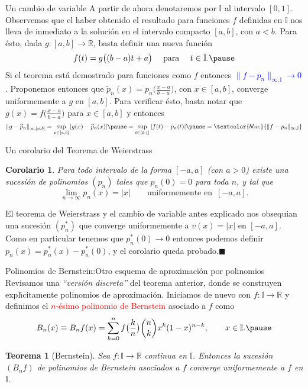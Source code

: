 \documentclass[xcolor=dvipsnames,10pt,handout, draft]{beamer}
\newcommand{\rz}{\mathbb R}
\newcommand{\intunit}{\mathbb I}
\newtheorem*{teo}{Teorema}
\newtheorem*{cor}{Corolario}
\begin{document}
\begin{frame}{Un cambio de variable}
A partir de ahora denotaremos por $\mathbb I$ al intervalo $[0,1]$.
\vskip5pt\pause
Observemos que el haber obtenido el resultado para funciones $f$ definidas en $\intunit$ nos lleva de inmediato a la soluci\'on en el intervalo compacto $[a,b]$, con $a<b$.
\vskip5pt\pause
Para \'esto, dada $g:[a,b]\to\rz$, basta definir una nueva funci\'on 
$$f(t)=g\big((b-a)t+a\big)\quad\text{ para }\quad t\in\intunit.\pause$$
Si el teorema est\'a demostrado para funciones como $f$ entonces \textcolor{blue}{$\|f-p_n\|_{\infty,\intunit}\to0$}. \pause Proponemos entonces que $\widetilde p_n(x)=p_n\big(\frac{x-a}{b-a}\big)$, con $x\in[a,b]$, converge uniformemente a $g$ en $[a,b]$.
\vskip5pt\pause
Para verificar \'esto, basta notar que $g(x)=f\big(\frac{x-a}{b-a}\big)$ para $x\in[a,b]$ \pause y entonces
$$\|g-\widetilde p_n\|_{\infty,[a,b]}=\sup_{x\in[a,b]}|g(x)-\widetilde p_n(x)|\pause=\sup_{t\in[0,1]}|f(t)-p_n(t)|\pause=\textcolor{blue}{\|f-p_n\|_{\infty,\intunit}}$$
\end{frame}


\begin{frame}{Un corolario del Teorema de Weierstrass}
\begin{cor}
Para todo intervalo de la forma $[-a,a]$ (con $a>0$) existe una sucesi\'on de polinomios $(p_n)$ tales que $p_n(0)=0$ para toda $n$, y tal que
$$\lim_{n\to\infty}p_n(x)=|x|\qquad\text{uniformemente en }\,[-a,a].$$
\end{cor}
\pause El teorema de Weierstrass y el cambio de variable antes explicado nos obsequian una sucesi\'on $(p_n^*)$ que converge uniformemente a $v(x)=|x|$ en $[-a,a]$.
\vskip5pt\pause
Como en particular tenemos que $p_n^*(0)\to0$ entonces podemos definir $p_n(x)=p_n^*(x)-p_n^*(0)$, y el corolario queda probado.\hfill$\blacksquare$
\end{frame}


\begin{frame}{Polinomios de Bernstein:}{Otro esquema de aproximaci\'on por polinomios}
Revisamos una {\em ``versi\'on discreta''} del teorema anterior, donde se construyen expl\'\i citamente polinomios de aproximaci\'on.
\vskip5pt\pause
Iniciamos de nuevo con $f:\intunit\to\rz$ y definimos el \textcolor{red}{$n$-\'esimo polinomio de Bernstein} asociado a $f$ como
$$B_n(x)\equiv B_nf(x)=\sum_{k=0}^nf\big(\frac{k}{n}\big){n\choose k}x^k(1-x)^{n-k},\qquad x\in\intunit.\pause$$
\begin{teo}[Bernstein]
Sea $f:\intunit\to\rz$ continua en $\intunit$. Entonces la sucesi\'on $(B_nf)$ de polinomios de Bernstein asociados a $f$ converge uniformemente a $f$ en $\intunit$.
\end{teo}
\end{frame}
\end{document}
